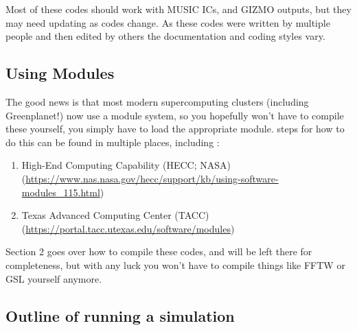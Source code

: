 \documentclass[10pt,a4paper,onecolumn]{article}
\begin{document}
Most of these codes should work with MUSIC ICs, and GIZMO outputs, but they may need updating as codes change. As these codes were written by multiple people and then edited by others the documentation and coding styles vary.

\subsection{Using Modules}

The good news is that most modern supercomputing clusters (including Greenplanet!) now use a module system, so you hopefully won't have to compile these yourself, you simply have to load the appropriate module. steps for how to do this can be found in multiple places, including :

\begin{enumerate}
\item High-End Computing Capability (HECC; NASA) (\url{https://www.nas.nasa.gov/hecc/support/kb/using-software-modules_115.html})

\item Texas Advanced Computing Center (TACC) (\url{https://portal.tacc.utexas.edu/software/modules})
\end{enumerate}

Section 2 goes over how to compile these codes, and will be left there for completeness, but with any luck you won't have to compile things like FFTW or GSL yourself anymore.

\subsection{Outline of running a simulation}
\end{document}
